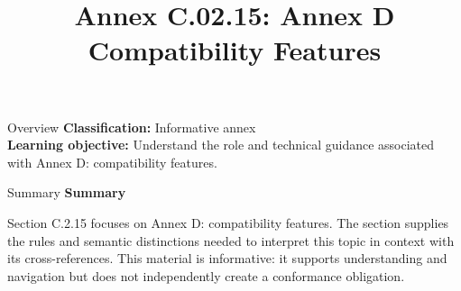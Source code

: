 \documentclass[10pt,letterpaper]{article}
\title{Annex C.02.15: Annex D Compatibility Features}
\author{}
\date{}
\begin{document}
\maketitle
\begin{CornellOverviewBox}{Overview}
\textbf{Classification:} Informative annex\\[2pt]
\textbf{Learning objective:} Understand the role and technical guidance associated with Annex D: compatibility features.
\end{CornellOverviewBox}\begin{CornellSummaryBox}{Summary}
{\sffamily\bfseries\color{Accent} Summary}\par\vspace{3pt}Section C.2.15 focuses on Annex D: compatibility features. The section supplies the rules and semantic distinctions needed to interpret this topic in context with its cross-references. This material is informative: it supports understanding and navigation but does not independently create a conformance obligation.
\end{CornellSummaryBox}
\end{document}
